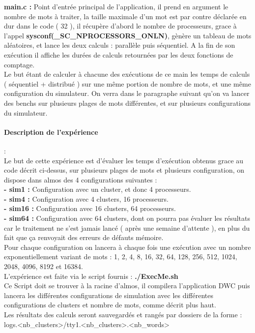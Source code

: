 \textbf{main.c :} Point d'entrée principal de l'application, il prend en argument le nombre de mots à traiter, la taille maximale d'un mot est par contre déclarée en dur dans le code ( 32 ), il récupère d'abord le nombre de processeurs, grace à l'appel \textbf{sysconf(\_SC\_NPROCESSORS\_ONLN)}, gènère un tableau de mots aléatoires, et lance les deux calculs : parallèle puis séquentiel. A la fin de son exécution il affiche les durées de calculs retournées par les deux fonctions de comptage.\\
Le but étant de calculer à chacune des exécutions de ce main les temps de calculs ( séquentiel + distribué ) sur une même portion de nombre de mots, et une même configuration du simulateur. On verra dans le paragraphe suivant qu'on va lancer des benchs sur plusieurs plages de mots différentes, et sur plusieurs configurations du simulateur.

\paragraph{Description de l'expérience}:\\

Le but de cette expérience est d'évaluer les temps d'exécution obtenus grace au code décrit ci-dessus, sur plusieurs plages de mots et plusieurs configuration, on dispose dans almos des 4 configurations suivantes :\\
\textbf{- sim1  :} Configuration avec un cluster, et donc 4 processeurs.\\
\textbf{- sim4  :} Configuration avec 4 clusters, 16 processeurs.\\
\textbf{- sim16 :} Configuration avec 16 clusters, 64 processeurs.\\
\textbf{- sim64 :} Configuration avec 64 clusters, dont on pourra pas évaluer les résultats car le traitement ne s'est jamais lancé ( après une semaine d'attente ), en plus du fait que ça renvoyait des erreurs de défauts mémoire.\\
Pour chaque configuration on lancera à chaque fois une exécution avec un nombre exponentiellement variant de mots : 1, 2, 4, 8, 16, 32, 64, 128, 256, 512, 1024, 2048, 4096, 8192 et 16384.\\
L'expérience est faite via le script fournis : \textbf{./ExecMe.sh}\\
Ce Script doit se trouver à la racine d'almos, il compilera l'application DWC puis lancera les différentes configurations de simulation avec les différentes configurations de clusters et nombre de mots, comme décrit plus haut.\\
Les résultats des calculs seront sauvegardés et rangés par dossiers de la forme : logs.<nb\_clusters>/tty1.<nb\_clusters>.<nb\_words>
